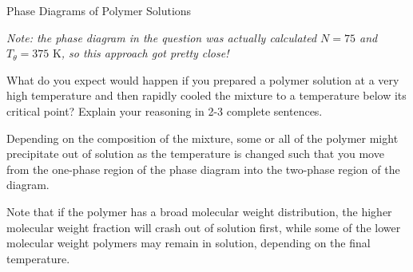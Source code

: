\begin{activity}{Phase Diagrams of Polymer Solutions}
\begin{exercises}
\begin{enumerate}
\begin{solution}{}
					\emph{Note: the phase diagram in the question was actually calculated $N=75$ and $T_\theta = 375\text{ K}$, so this approach got pretty close!}
					
				\end{solution}
				
			
		\end{enumerate}
		
	\exercise What do you expect would happen if you prepared a polymer solution at a very high temperature and then rapidly cooled the mixture to a temperature below its critical point?  Explain your reasoning in 2-3 complete sentences.
			
				\begin{solution}{}
					Depending on the composition of the mixture, some or all of the polymer might precipitate out of solution as the temperature is changed such that you move from the one-phase region of the phase diagram into the two-phase region of the diagram.
					
					Note that if the polymer has a broad molecular weight distribution, the higher molecular weight fraction will crash out of solution first, while some of the lower molecular weight polymers may remain in solution, depending on the final temperature.
				\end{solution}
				
		
\end{exercises}
	
\end{activity}